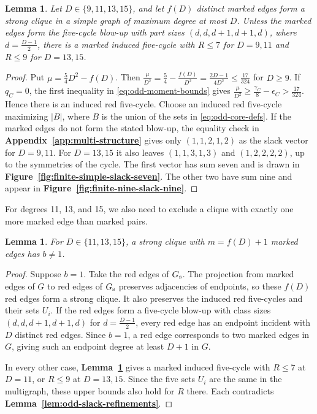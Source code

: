 \documentclass[preprint,11pt,numbers]{elsarticle-arxiv}
\numberwithin{equation}{section}
\newtheorem{lemma}[theorem]{Lemma}
\theoremstyle{definition}
\begin{document}
\begin{lemma}\label{lem:supp-simple-equality}
Let $D\in\{9,11,13,15\}$, and let $f(D)$ distinct marked edges form
a strong clique in a simple graph of maximum degree at most $D$.
Unless the marked edges form the five-cycle blow-up with part sizes
$(d,d,d+1,d+1,d)$, where $d=\frac{D-1}{2}$, there is a marked
induced five-cycle with $R\le7$ for $D=9,11$ and $R\le9$ for $D=13,15$.
\end{lemma}

\begin{proof}
Put $\mu=\frac{5}{4}D^2-f(D)$. Then
$\frac{\mu}{D^2}=\frac{5}{4}-\frac{f(D)}{D^2}
=\frac{2D-1}{4D^2}\le\frac{17}{324}$ for $D\ge9$.
If $q_C=0$, the first inequality in \eqref{eq:odd-moment-bounds}
gives $\frac{\mu}{D^2}\ge\frac{\gamma_C}{8}-\epsilon_C
>\frac{17}{324}$. Hence there is an induced red five-cycle.
Choose an induced red five-cycle maximizing $|B|$, where $B$
is the union of the sets in \eqref{eq:odd-core-defs}. If the
marked edges do not form the stated blow-up, the equality check
in \textbf{Appendix~\ref{app:multi-structure}} gives only
$(1,1,2,1,2)$ as the slack vector for $D=9,11$. For $D=13,15$ it
also leaves $(1,1,3,1,3)$ and $(1,2,2,2,2)$, up to the symmetries
of the cycle. The first vector has sum seven and is drawn in
\textbf{Figure~\ref{fig:finite-simple-slack-seven}}. The other two
have sum nine and appear in \textbf{Figure~\ref{fig:finite-nine-slack-nine}}.
\end{proof}

For degrees 11, 13, and 15, we also need to exclude a clique with
exactly one more marked edge than marked pairs.

\begin{lemma}\label{lem:single-extra-copy}
For $D\in\{11,13,15\}$, a strong clique with $m=f(D)+1$ marked
edges has $b\ne1$.
\end{lemma}

\begin{proof}
Suppose $b=1$. Take the red edges of $G_{\rm s}$. The projection
from marked edges of $G$ to red edges of $G_{\rm s}$ preserves
adjacencies of endpoints, so these $f(D)$ red edges form a
strong clique. It also preserves the induced red five-cycles
and their sets $U_i$. If the red edges form a five-cycle
blow-up with class sizes $(d,d,d+1,d+1,d)$ for
$d=\frac{D-1}{2}$, every red edge has an endpoint incident
with $D$ distinct red edges. Since $b=1$, a red edge
corresponds to two marked edges in $G$, giving such an endpoint
degree at least $D+1$ in $G$.

In every other case, \textbf{Lemma~\ref{lem:supp-simple-equality}}
gives a marked induced five-cycle with $R\le7$ at $D=11$, or
$R\le9$ at $D=13,15$. Since the five sets $U_i$ are the same
in the multigraph, these upper bounds
also hold for $R$ there. Each contradicts
\textbf{Lemma~\ref{lem:odd-slack-refinements}}.
\end{proof}
\relax\space%
\end{document}

